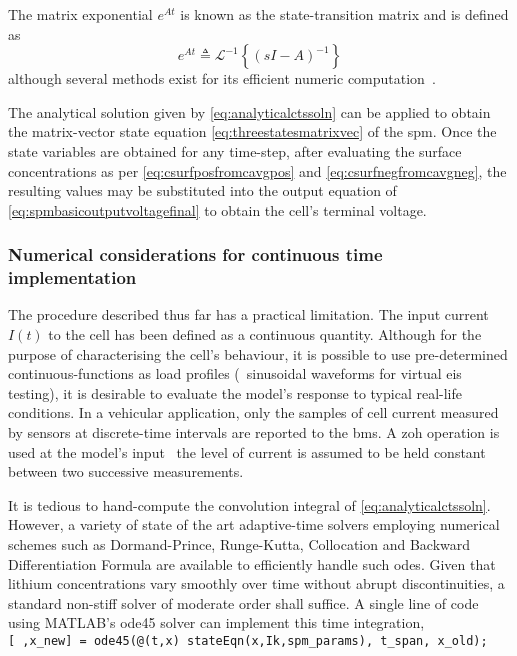The matrix exponential $e^{At}$ is known as the state-transition matrix and is
defined as
\begin{equation}
    e^{A t} ≜ \mathcal{L}^{-1}\left\{(s I - A)^{-1}\right\}
\end{equation}
although several methods exist for its efficient numeric
computation~\cite{Moler2003}.

The analytical solution  given by \cref{eq:analyticalctssoln} can  be applied to
obtain the  matrix-vector state  equation \cref{eq:threestatesmatrixvec}  of the
\gls{spm}.  Once the  state  variables  are obtained  for  any time-step,  after
evaluating the  surface concentrations as per  \cref{eq:csurfposfromcavgpos} and
\cref{eq:csurfnegfromcavgneg}, the resulting values  may be substituted into the
output  equation of  \cref{eq:spmbasicoutputvoltagefinal} to  obtain the  cell's
terminal voltage.

\subsubsection*{Numerical considerations for continuous time implementation}

The procedure described  thus far has a practical limitation.  The input current
$I(t)$  to the  cell has  been defined  as a  continuous quantity.  Although for
the  purpose of  characterising  the cell's  behaviour, it  is  possible to  use
pre-determined continuous-functions as load profiles (\eg{}~sinusoidal waveforms
for virtual \gls{eis} testing), it is desirable to evaluate the model's response
to typical real-life conditions. In a vehicular application, only the samples of
cell current measured by sensors at  discrete-time intervals are reported to the
\gls{bms}. A \gls{zoh} operation is used at the model's input \ie~the level of
current  is assumed  to be  held constant  between two  successive measurements.

It    is    tedious    to    hand-compute   the    convolution    integral    of
\cref{eq:analyticalctssoln}.   However,  a   variety   of  state   of  the   art
adaptive-time  solvers  employing  numerical  schemes  such  as  Dormand-Prince,
Runge-Kutta,  Collocation and  Backward  Differentiation  Formula are  available
to  efficiently  handle  such  \glspl{ode}. Given  that  lithium  concentrations
vary smoothly  over time  without abrupt  discontinuities, a  standard non-stiff
solver  of  moderate   order  shall  suffice.  A  single  line   of  code  using
\textsc{MATLAB}'s ode45  solver can  implement this  time integration,  \eg{} \\
\texttt{[~,x_new] =  ode45(@(t,x) stateEqn(x,Ik,spm_params), t_span,
x_old); }

